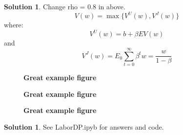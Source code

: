 \documentclass[letterpaper,12pt]{article}
\theoremstyle{definition}
\newtheorem{solution}[theorem]{Solution}
\begin{document}
\begin{solution}
Change rho = 0.8 in above.
$$V(w) = \max\{V^U(w), V^J(w)\}$$
where: $$V^U(w)= b + \beta E V(w)$$ and $$V^J(w) = E_0 \sum_{t=0}^{\infty} \beta^t w = \frac{w}{1 - \beta} $$
\begin{figure}[htb]\centering\captionsetup{width=4.0in}
  \caption{\textbf{Great example figure}}\label{}
\end{figure}
\begin{figure}[htb]\centering\captionsetup{width=4.0in}
  \caption{\textbf{Great example figure}}\label{}
\end{figure}
\begin{figure}[htb]\centering\captionsetup{width=4.0in}
  \caption{\textbf{Great example figure}}\label{}
\end{figure}
\end{solution}

\newpage
\begin{solution}
See LaborDP.ipyb for answers and code.
\end{solution}
\end{document}
